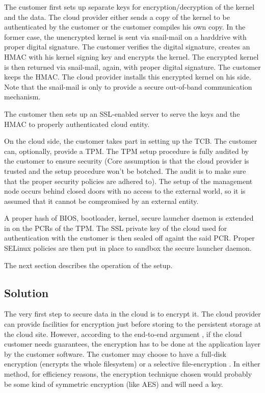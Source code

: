\documentclass[10pt,twocolumn,pdftex]{article}
\begin{document}
The customer first sets up separate keys for encryption/decryption of the kernel and the data. The cloud provider either sends a copy of the kernel to be authenticated by the customer or the customer compiles his own copy. In the former case, the unencrypted kernel is sent via snail-mail on a harddrive with proper digital signature. The customer verifies the digital signature, creates an HMAC with his kernel signing key and encrypts the kernel. The encrypted kernel is then returned via snail-mail, again, with proper digital signature. The customer keeps the HMAC. The cloud provider installs this encrypted kernel on his side. Note that the snail-mail is only to provide a secure out-of-band communication mechanism.

The customer then sets up an SSL-enabled server to serve the keys and the HMAC to properly authenticated cloud entity. 

On the cloud side, the customer takes part in setting up the TCB. The customer can, optionally, provide a TPM. The TPM setup procedure is fully audited by the customer to ensure security (Core assumption is that the cloud provider is trusted and the setup procedure won't be botched. The audit is to make sure that the proper security policies are adhered to). The setup of the management node occurs behind closed doors with no access to the external world, so it is assumed that it cannot be compromised by an external entity.

A proper hash of {BIOS, bootloader, kernel, secure launcher daemon} is extended in on the PCRs of the TPM. The SSL private key of the cloud used for authentication with the customer is then sealed off againt the said PCR. Proper SELinux policies are then put in place to sandbox the secure launcher daemon.

The next section describes the operation of the setup.

\subsection{Solution}
The very first step to secure data in the cloud is to encrypt it. The cloud provider can provide facilities for encryption just before storing to the persistent storage at the cloud site. However, according to the end-to-end argument \cite{end-to-end}, if the cloud customer needs guarantees, the encryption has to be done at the application layer by the customer software. The customer may choose to have a full-disk encryption (encrypts the whole filesystem) \cite{disk-encryption, truecrypt} or a selective file-encryption \cite{nss}. In either method, for efficiency reasons, the encryption technique chosen would probably be some kind of symmetric encryption (like AES) and will need a key. 
\end{document}
